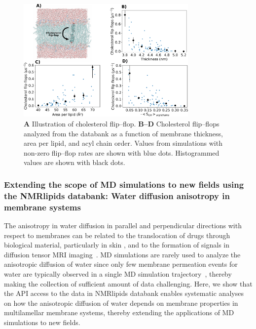 \documentclass[fleqn,10pt]{wlscirep}
\begin{document}
\begin{figure}[htb]
    \centering
    \includegraphics[width=88mm]{Figures/CholFlipFlops.pdf}
    \caption{\textbf{A} Illustration of cholesterol flip--flop.  
      \textbf{B--D} Cholesterol flip--flops analyzed from the databank as a function of membrane thickness, area per lipid, and acyl chain order. Values from simulations with non-zero flip--flop rates are shown with blue dots. Histogrammed values are shown with black dots.
    }
    \label{fig:flip-flops}
\end{figure}



\subsubsection{Extending the scope of MD simulations to new fields using the NMRlipids databank: Water diffusion anisotropy in membrane systems}
The anisotropy in water diffusion in parallel and perpendicular directions with respect to membranes can be related to the translocation of drugs  through biological material, particularly in skin \cite{hansen13,wen18,nitsche19,roberts21}, and to the formation of signals in diffusion tensor MRI imaging~\cite{topgaard20}. MD simulations are rarely used to analyze the anisotropic diffusion of water since only few membrane permeation events for water are typically observed in a single MD simulation trajectory~\cite{venable19,camilo2022}, thereby making the collection of sufficient amount of data challenging. Here, we show that the API access to the data in NMRlipids databank enables systematic analyses on how the anisotropic diffusion of water depends on membrane properties in multilamellar membrane systems, thereby extending the applications of MD simulations to new fields. 
\end{document}
